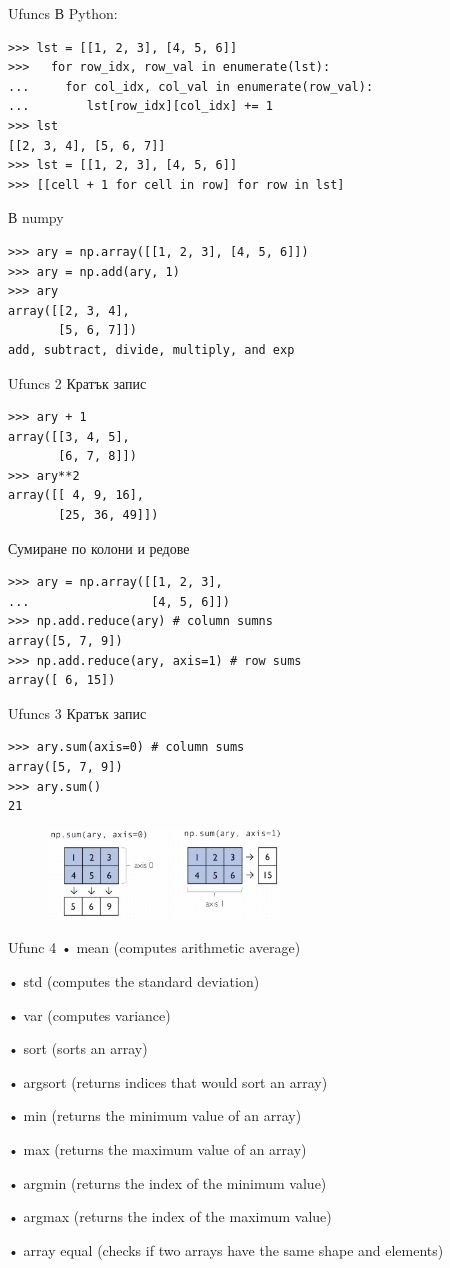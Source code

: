 \documentclass{beamer}
\begin{document}
\begin{frame}[fragile]{Ufuncs}
В Python:
\begin{verbatim}
>>> lst = [[1, 2, 3], [4, 5, 6]]
>>>   for row_idx, row_val in enumerate(lst):
...     for col_idx, col_val in enumerate(row_val):
...        lst[row_idx][col_idx] += 1
>>> lst
[[2, 3, 4], [5, 6, 7]]
>>> lst = [[1, 2, 3], [4, 5, 6]]
>>> [[cell + 1 for cell in row] for row in lst]
\end{verbatim}
В numpy
\begin{verbatim}
>>> ary = np.array([[1, 2, 3], [4, 5, 6]])
>>> ary = np.add(ary, 1)
>>> ary
array([[2, 3, 4],
       [5, 6, 7]])
add, subtract, divide, multiply, and exp
\end{verbatim}
\end{frame}

\begin{frame}[fragile]{Ufuncs 2}
Кратък запис
\begin{verbatim}
>>> ary + 1
array([[3, 4, 5],
       [6, 7, 8]])
>>> ary**2
array([[ 4, 9, 16],
       [25, 36, 49]])
\end{verbatim}       
Сумиране по колони и редове
\begin{verbatim}
>>> ary = np.array([[1, 2, 3],
...                 [4, 5, 6]])
>>> np.add.reduce(ary) # column sumns
array([5, 7, 9])
>>> np.add.reduce(ary, axis=1) # row sums
array([ 6, 15])
\end{verbatim}
\end{frame}

\begin{frame}[fragile]{Ufuncs 3}
Кратък запис
\begin{verbatim}
>>> ary.sum(axis=0) # column sums
array([5, 7, 9])
>>> ary.sum()
21
\end{verbatim}
\begin{figure}
    \centering
    \includegraphics[width=0.55\textwidth]{np3.png}
\end{figure}
\end{frame}

\begin{frame}{Ufunc 4}
• mean (computes arithmetic average)

• std (computes the standard deviation)

• var (computes variance)

• sort (sorts an array)

• argsort (returns indices that would sort an array)

• min (returns the minimum value of an array)

• max (returns the maximum value of an array)

• argmin (returns the index of the minimum value)

• argmax (returns the index of the maximum value)

• array equal (checks if two arrays have the same shape and elements)
\end{frame}
\end{document}

